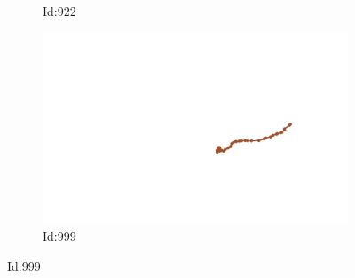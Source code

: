 \documentclass[12pt,twoside]{report}
\begin{document}
\begin{figure}
\begin{subfigure}[b]{0.20\textwidth}
\caption{Id:922}
\end{subfigure}
\begin{subfigure}[b]{0.20\textwidth}
\centering
\includegraphics[width=\textwidth]{../trajectories/999.png}
\caption{Id:999}
\end{subfigure}
\end{figure}
\end{document}
